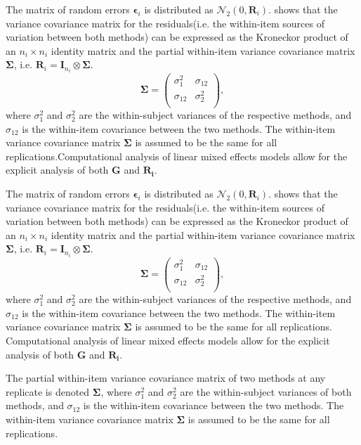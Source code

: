 \documentclass[12pt, a4paper]{report}
\theoremstyle{plain}
\theoremstyle{definition}
\theoremstyle{remark}
\begin{document}
The matrix of random errors $\boldsymbol{\epsilon}_i$ is distributed as $\mathcal{N}_2(0,\boldsymbol{R}_i)$.
\citet{hamlett} shows that the variance covariance matrix for the residuals(i.e. the within-item sources of variation between both methods) can be expressed as the Kroneckor product of an $n_i \times n_i$ identity matrix and the partial within-item variance covariance matrix $\boldsymbol{\Sigma}$, i.e. $\boldsymbol{R}_{i} = \boldsymbol{I}_{n_{i}} \otimes \boldsymbol{\Sigma}$.
\[
\boldsymbol{\Sigma} = \left( \begin{array}{cc}
\sigma^2_{1} & \sigma_{12} \\
\sigma_{12} & \sigma^2_{2} \\
\end{array}\right),
\]
where $\sigma^2_{1}$ and $\sigma^2_{2}$ are the within-subject variances of the respective methods, and $\sigma_{12}$ is the within-item covariance between the two methods. The within-item variance covariance matrix $\boldsymbol{\Sigma}$ is assumed to be the same for all replications.Computational analysis of linear mixed effects models allow for the explicit analysis of both $\boldsymbol{G}$ and $\boldsymbol{R_i}$.



The matrix of random errors $\boldsymbol{\epsilon}_i$ is distributed as $\mathcal{N}_2(0,\boldsymbol{R}_i)$.
\citet{hamlett} shows that the variance covariance matrix for the residuals(i.e. the within-item sources of variation between both methods) can be expressed as the Kroneckor product of an $n_i \times n_i$ identity matrix and the partial within-item variance covariance matrix $\boldsymbol{\Sigma}$, i.e. $\boldsymbol{R}_{i} = \boldsymbol{I}_{n_{i}} \otimes \boldsymbol{\Sigma}$.
\[
\boldsymbol{\Sigma} = \left( \begin{array}{cc}
\sigma^2_{1} & \sigma_{12} \\
\sigma_{12} & \sigma^2_{2} \\
\end{array}\right),
\]
where $\sigma^2_{1}$ and $\sigma^2_{2}$ are the within-subject variances of the respective methods, and $\sigma_{12}$ is the within-item covariance between the two methods. The within-item variance covariance matrix $\boldsymbol{\Sigma}$ is assumed to be the same for all replications. Computational analysis of linear mixed effects models allow for the explicit analysis of both $\boldsymbol{G}$ and $\boldsymbol{R_i}$. 

\bigskip

The partial within-item variance covariance matrix of two methods at any replicate is denoted $\boldsymbol{\Sigma}$, where $\sigma^2_{1}$ and $\sigma^2_{2}$ are the within-subject variances of both methods, and $\sigma_{12}$ is the within-item covariance between the two methods. The within-item variance covariance matrix $\boldsymbol{\Sigma}$ is assumed to be the same for all replications.
\end{document}
